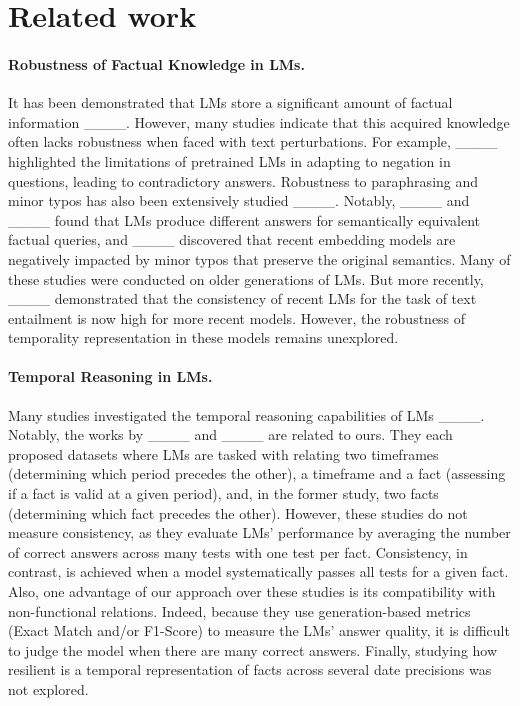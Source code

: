 \section{Related work}
\label{sec:related_work}

\paragraph{Robustness of Factual Knowledge in LMs.} It has been demonstrated that LMs store a significant amount of factual information ____. However, many studies indicate that this acquired knowledge often lacks robustness when faced with text perturbations. For example, ____ highlighted the limitations of pretrained LMs in adapting to negation in questions, leading to contradictory answers. Robustness to paraphrasing and minor typos has also been extensively studied ____. Notably, ____ and ____ found that LMs produce different answers for semantically equivalent factual queries, and ____ discovered that recent embedding models are negatively impacted by minor typos that preserve the original semantics. Many of these studies were conducted on older generations of LMs. But more recently, ____ demonstrated that the consistency of recent LMs for the task of text entailment is now high for more recent models. However, the robustness of temporality representation in these models remains unexplored.

\paragraph{Temporal Reasoning in LMs.} Many studies investigated the temporal reasoning capabilities of LMs ____. Notably, the works by ____ and ____ are related to ours. They each proposed datasets where LMs are tasked with relating two timeframes (\eg determining which period precedes the other), a timeframe and a fact (\eg assessing if a fact is valid at a given period), and, in the former study, two facts (\eg determining which fact precedes the other). However, these studies do not measure consistency, as they evaluate LMs' performance by averaging the number of correct answers across many tests with one test per fact. Consistency, in contrast, is achieved when a model systematically passes all tests for a given fact. Also, one advantage of our approach over these studies is its compatibility with non-functional relations. Indeed, because they use generation-based metrics (Exact Match and/or F1-Score) to measure the LMs' answer quality, it is difficult to judge the model when there are many correct answers. Finally, studying how resilient is a temporal representation of facts across several date precisions was not explored.

